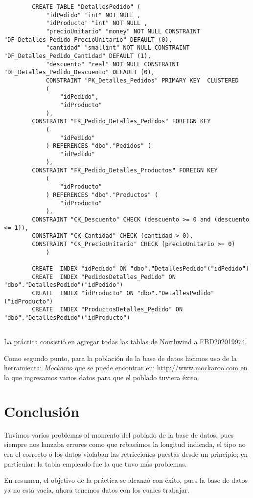 \documentclass[12pt, letterpaper]{article}
\begin{document}
{\begin{lstlisting}
        CREATE TABLE "DetallesPedido" (
            "idPedido" "int" NOT NULL ,
            "idProducto" "int" NOT NULL ,
            "precioUnitario" "money" NOT NULL CONSTRAINT "DF_Detalles_Pedido_PrecioUnitario" DEFAULT (0),
            "cantidad" "smallint" NOT NULL CONSTRAINT "DF_Detalles_Pedido_Cantidad" DEFAULT (1),
            "descuento" "real" NOT NULL CONSTRAINT "DF_Detalles_Pedido_Descuento" DEFAULT (0),
            CONSTRAINT "PK_Detalles_Pedidos" PRIMARY KEY  CLUSTERED
            (
                "idPedido",
                "idProducto"
            ),
        CONSTRAINT "FK_Pedido_Detalles_Pedidos" FOREIGN KEY
            (
                "idPedido"
            ) REFERENCES "dbo"."Pedidos" (
                "idPedido"
            ),
        CONSTRAINT "FK_Pedido_Detalles_Productos" FOREIGN KEY
            (
                "idProducto"
            ) REFERENCES "dbo"."Productos" (
                "idProducto"
            ),
        CONSTRAINT "CK_Descuento" CHECK (descuento >= 0 and (descuento <= 1)),
        CONSTRAINT "CK_Cantidad" CHECK (cantidad > 0),
        CONSTRAINT "CK_PrecioUnitario" CHECK (precioUnitario >= 0)
            )

        CREATE  INDEX "idPedido" ON "dbo"."DetallesPedido"("idPedido")
        CREATE  INDEX "PedidosDetalles_Pedido" ON "dbo"."DetallesPedido"("idPedido")
        CREATE  INDEX "idProducto" ON "dbo"."DetallesPedido"("idProducto")
        CREATE  INDEX "ProductosDetalles_Pedido" ON "dbo"."DetallesPedido"("idProducto")
 
    \end{lstlisting}} \vspace{.3cm}

    La práctica consistió en agregar todas las tablas de Northwind a FBD202019974.\vspace{.3cm}

    Como segundo punto, para la población de la base de datos hicimos uso de la herramienta:
    \textit{Mockaroo} que se puede encontrar en: \url{http://www.mockaroo.com} en la que ingresamos
    varios datos para que el poblado tuviera éxito.
    
    \section*{Conclusión}
    Tuvimos varios problemas al momento del poblado de la base de datos, pues siempre nos lanzaba 
    errores como que rebasámos la longitud indicada, el tipo no era el correcto o los datos violaban 
    las retricciones puestas desde un principio; en particular: la tabla empleado fue la que tuvo 
    más problemas.\vspace{.3cm}

    En resumen, el objetivo de la práctica se alcanzó con éxito, pues la base de datos ya no 
    está vacía, ahora tenemos datos con los cuales trabajar.
\end{document}
